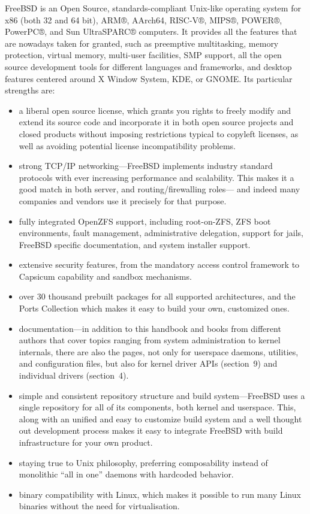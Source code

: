 FreeBSD is an Open Source, standards-compliant Unix-like operating system for
x86 (both 32 and 64 bit), ARM®, AArch64, RISC-V®, MIPS®, POWER®, PowerPC®, and
Sun UltraSPARC® computers.
It provides all the features that are nowadays taken for granted, such as
preemptive multitasking, memory protection, virtual memory, multi-user
facilities, SMP support, all the open source development tools for different
languages and frameworks, and desktop features centered around X Window System,
KDE, or GNOME.
Its particular strengths are:
\begin{itemize}
\item
   a liberal open source license, which grants you rights to freely modify and
   extend its source code and incorporate it in both open source projects and
   closed products without imposing restrictions typical to copyleft licenses,
   as well as avoiding potential license incompatibility problems.
\item
   strong TCP/IP networking---FreeBSD implements industry standard protocols
   with ever increasing performance and scalability.
   This makes it a good match in both server, and routing/firewalling roles---%
   and indeed many companies and vendors use it precisely for that purpose.
\item
   fully integrated OpenZFS support, including root-on-ZFS, ZFS boot
   environments, fault management, administrative delegation, support for jails,
   FreeBSD specific documentation, and system installer support.
\item
   extensive security features, from the mandatory access control framework to
   Capsicum capability and sandbox mechanisms.
\item
   over 30 thousand prebuilt packages for all supported architectures, and the
   Ports Collection which makes it easy to build your own, customized ones.
\item
   documentation---in addition to this handbook and books from different authors
   that cover topics ranging from system administration to kernel internals,
   there are also the  pages, not only for userspace daemons,
   utilities, and configuration files, but also for kernel driver APIs
   (section~9) and individual drivers (section~4).
\item
   simple and consistent repository structure and build system---FreeBSD uses a
   single repository for all of its components, both kernel and userspace.
   This, along with an unified and easy to customize build system and a well
   thought out development process makes it easy to integrate FreeBSD with build
   infrastructure for your own product.
\item
   staying true to Unix philosophy, preferring composability instead of
   monolithic ``all in one'' daemons with hardcoded behavior.
\item
   binary compatibility with Linux, which makes it possible to run many Linux
   binaries without the need for virtualisation.
\end{itemize}

